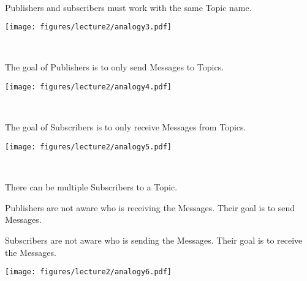 \documentclass[usenames,11,dvipsnames,svgnames,x11names,aspectratio=1610,bibref]{beamer}
\newcommand{\mydisclaimer}{{\color{disclaimer}{\scriptsize ROS 2 -- Part I}}}
\renewcommand\sec{{\cnordSix{\secname}\hfill\mydisclaimer~} }
\begin{document}
\begin{frame}[fragile]{\sec}
\vspace*{\fill}
\begin{center} 
Publishers and subscribers must work with the same Topic name.

\hrulefill

\texttt{[image: figures/lecture2/analogy3.pdf]}

\end{center}
\vspace*{\fill}
\end{frame}


\begin{frame}[fragile]{\sec}
\vspace*{\fill}
\begin{center} 
The goal of Publishers is to only send Messages to Topics.

\hrulefill

\texttt{[image: figures/lecture2/analogy4.pdf]}

\end{center}
\vspace*{\fill}
\end{frame}


\begin{frame}[fragile]{\sec}
\vspace*{\fill}
\begin{center} 
The goal of Subscribers is to only receive Messages from Topics.

\hrulefill

\texttt{[image: figures/lecture2/analogy5.pdf]}

\end{center}
\vspace*{\fill}
\end{frame}



\begin{frame}[fragile]{\sec}
\vspace*{\fill}
\begin{center} 
There can be multiple Subscribers to a Topic. 

\hrulefill

\begin{compactitem}
\footnotesize
\item Publishers are not aware who is receiving the Messages. Their goal is to send Messages.
\item Subscribers are not aware who is sending the Messages. Their goal is to receive the Messages.
\end{compactitem}

\texttt{[image: figures/lecture2/analogy6.pdf]}

\end{center}
\vspace*{\fill}
\end{frame}
\end{document}
